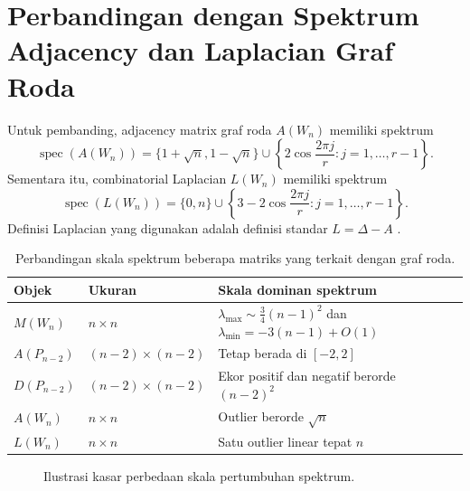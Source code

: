\documentclass[12pt,a4paper]{article}
\theoremstyle{definition}
\newcommand{\spec}{\operatorname{spec}}
\begin{document}
\section{Perbandingan dengan Spektrum Adjacency dan Laplacian Graf Roda}

Untuk pembanding, adjacency matrix graf roda $A(W_n)$ memiliki spektrum
\[
  \spec(A(W_n))=
  \{1+\sqrt n,1-\sqrt n\}\cup
  \left\{
  2\cos\frac{2\pi j}{r}:j=1,\ldots,r-1
  \right\}.
\]
Sementara itu, combinatorial Laplacian $L(W_n)$ memiliki spektrum
\[
  \spec(L(W_n))=
  \{0,n\}\cup
  \left\{
  3-2\cos\frac{2\pi j}{r}:j=1,\ldots,r-1
  \right\}.
\]
Definisi Laplacian yang digunakan adalah definisi standar $L=\Delta-A$ \citep{chung1997spectral}.

\begin{table}[h]
  \centering
  \begin{tabular}{>{\raggedright\arraybackslash}p{3.2cm}p{3.7cm}p{5.3cm}}
    \toprule
    Objek        & Ukuran             & Skala dominan spektrum                                                \\
    \midrule
    $M(W_n)$     & $n\times n$        & $\lambda_{\max}\sim \frac34(n-1)^2$ dan $\lambda_{\min}=-3(n-1)+O(1)$ \\
    $A(P_{n-2})$ & $(n-2)\times(n-2)$ & Tetap berada di $[-2,2]$                                              \\
    $D(P_{n-2})$ & $(n-2)\times(n-2)$ & Ekor positif dan negatif berorde $(n-2)^2$                            \\
    $A(W_n)$     & $n\times n$        & Outlier berorde $\sqrt n$                                             \\
    $L(W_n)$     & $n\times n$        & Satu outlier linear tepat $n$                                         \\
    \bottomrule
  \end{tabular}
  \caption{Perbandingan skala spektrum beberapa matriks yang terkait dengan graf roda.}
  \label{tab:perbandingan}
\end{table}

\begin{figure}[h]
  \centering
  \caption{Ilustrasi kasar perbedaan skala pertumbuhan spektrum.}
  \label{fig:skala}
\end{figure}
\end{document}
